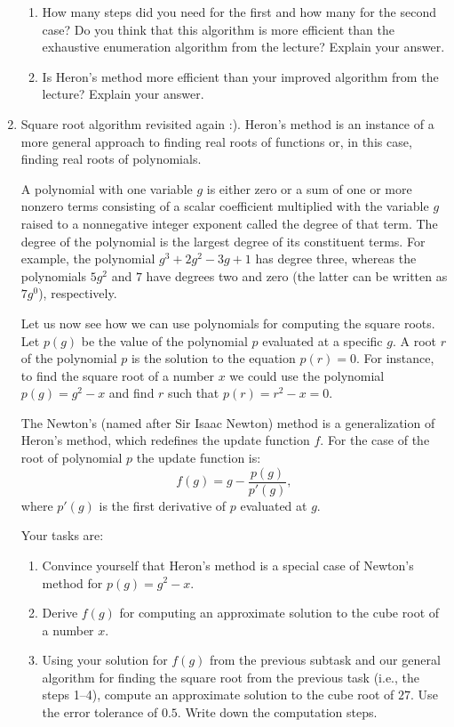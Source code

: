 \documentclass[a4paper,10pt]{article}
\begin{document}
\begin{enumerate}
\begin{enumerate}
    \item How many steps did you need for the first and how many for the second case? Do you think that this algorithm is more efficient than the exhaustive enumeration algorithm from the lecture? Explain your answer.

    \item Is Heron’s method more efficient than your improved algorithm from the lecture? Explain your answer.
  \end{enumerate}

\newpage
\mbox{} 

\newpage
\mbox{} 

  \item Square root algorithm revisited again :). Heron’s method is an instance of a more general approach to finding real roots of functions or, in this case, finding real roots of polynomials.

  A polynomial with one variable $g$ is either zero or a sum of one or more nonzero terms consisting of a scalar coefficient multiplied with the variable $g$ raised to a nonnegative integer exponent called the degree of that term. The degree of the polynomial is the largest degree of its constituent terms. For example, the polynomial $g^3 + 2g^2 - 3g + 1$ has degree three, whereas the polynomials $5g^2$ and $7$ have degrees two and zero (the latter can be written as $7g^0$), respectively.

  Let us now see how we can use polynomials for computing the square roots. Let $p(g)$ be the value of the polynomial $p$ evaluated at a specific $g$. A root $r$ of the polynomial $p$ is the solution to the equation $p(r) = 0$. For instance, to find the square root of a number $x$ we could use the polynomial $p(g) = g^2 - x$ and find $r$ such that $p(r) = r^2 - x = 0$.

  The Newton’s (named after Sir Isaac Newton) method is a generalization of Heron’s method, which redefines the update function $f$. For the case of the root of polynomial $p$ the update function is:
  \[
    f(g) = g - \frac{p(g)}{p'(g)},
  \]
  where $p'(g)$ is the first derivative of $p$ evaluated at $g$.

  Your tasks are:
  \begin{enumerate}
    \item Convince yourself that Heron’s method is a special case of Newton’s method for $p(g) = g^2 - x$.
    \item Derive $f(g)$ for computing an approximate solution to the cube root of a number $x$.
    \item Using your solution for $f(g)$ from the previous subtask and our general algorithm for finding the square root from the previous task (i.e., the steps 1--4), compute an approximate solution to the cube root of $27$. Use the error tolerance of $0.5$. Write down the computation steps.
  \end{enumerate}


\end{enumerate}
\end{document}
